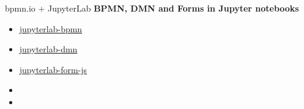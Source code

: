 \documentclass[12pt,aspectratio=169]{beamer}
\begin{document}
\begin{frame}{bpmn.io + JupyterLab}
\textbf{BPMN, DMN and Forms in Jupyter notebooks}
\par
\vspace{0.5cm}
\par
\begin{minipage}{0.5\textwidth}
\begin{itemize}
    \item<1->  \href{https://github.com/datakurre/jupyterlab-bpmn}{jupyterlab-bpmn}
    \item<2-> \href{https://github.com/datakurre/jupyterlab-dmn}{jupyterlab-dmn}
    \item<3-> \href{https://github.com/datakurre/jupyterlab-form-js}{jupyterlab-form-js}
    \item[]
    \item[]
\end{itemize}
\end{minipage}
\begin{minipage}{0.45\textwidth}
\end{minipage}
\end{frame}
\end{document}

